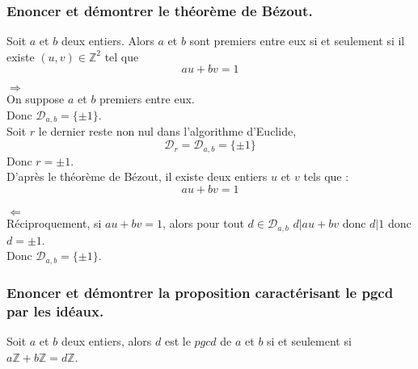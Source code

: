 \documentclass[titlepage, twoside]{report}
\begin{document}
\subsubsection{Enoncer et démontrer le théorème de Bézout. }
\begin{tcolorbox}[title=Théorème 12.26, title filled=false, colframe=orange, colback=orange!10!white]
    Soit $a$ et $b$ deux entiers. Alors $a$ et $b$ sont premiers entre eux si et seulement si il existe $(u,v) \in \mathbb{Z}^2$ tel que
    $$au + bv = 1$$
\end{tcolorbox}

$\boxed{\Rightarrow}$ \\
On suppose $a$ et $b$ premiers entre eux. \\
Donc $\mathcal{D}_{a,b} = \{\pm 1\}$. \\
Soit $r$ le dernier reste non nul dans l'algorithme d'Euclide, \\
$$\mathcal{D}_r = \mathcal{D}_{a,b} = \{\pm 1\}$$
Donc $r = \pm 1$. \\
D'après le théorème de Bézout, il existe deux entiers $u$ et $v$ tels que : 
$$au + bv = 1$$ \\

$\boxed{\Leftarrow}$ \\
Réciproquement, si $au + bv = 1$, alors pour tout $d \in \mathcal{D}_{a,b}$ $d|au + bv$ donc $d|1$ donc $d = \pm 1$. \\
Donc $\mathcal{D}_{a,b} = \{\pm 1\}$. 

\subsubsection{Enoncer et démontrer la proposition caractérisant le pgcd par les idéaux. }
\begin{tcolorbox}[title=Propostion 12.37, title filled=false, colframe=lightblue, colback=lightblue!10!white]
    Soit $a$ et $b$ deux entiers, alors $d$ est le $pgcd$ de $a$ et $b$ si et seulement si $a \mathbb{Z} + b \mathbb{Z} = d \mathbb{Z}$.
\end{tcolorbox}
\end{document}
